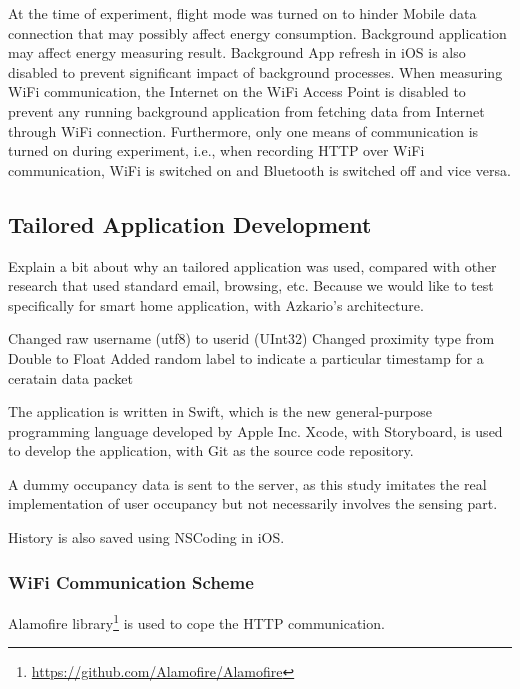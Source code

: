 \documentclass[journal]{vgtc}                %
\begin{document}
At the time of experiment, flight mode was turned on to hinder Mobile data connection that may possibly affect energy consumption.  Background application may affect energy measuring result. Background App refresh in iOS is also disabled to prevent significant impact of background processes. When measuring WiFi communication, the Internet on the WiFi Access Point is disabled to prevent any running background application from fetching data from Internet through WiFi connection. Furthermore, only one means of communication is turned on during experiment, i.e., when recording HTTP over WiFi communication, WiFi is switched on and Bluetooth is switched off and vice versa.


\subsection{Tailored Application Development} %
\label{sub:tailored_application_development}
Explain a bit about why an tailored application was used, compared with other research that used standard email, browsing, etc.
Because we would like to test specifically for smart home application, with Azkario's architecture.

Changed raw username (utf8) to userid (UInt32)
Changed proximity type from Double to Float
Added random label to indicate a particular timestamp for a ceratain data packet

The application is written in Swift, which is the new general-purpose programming language developed by Apple Inc. Xcode, with Storyboard, is used to develop the application, with Git as the source code repository.

A dummy occupancy data is sent to the server, as this study imitates the real implementation of user occupancy but not necessarily involves the sensing part.

History is also saved using NSCoding in iOS.

\subsubsection{WiFi Communication Scheme} %
\label{ssub:wifi_communication_scheme}
Alamofire library\footnote{\url{https://github.com/Alamofire/Alamofire}} is used to cope the HTTP communication.

\end{document}
